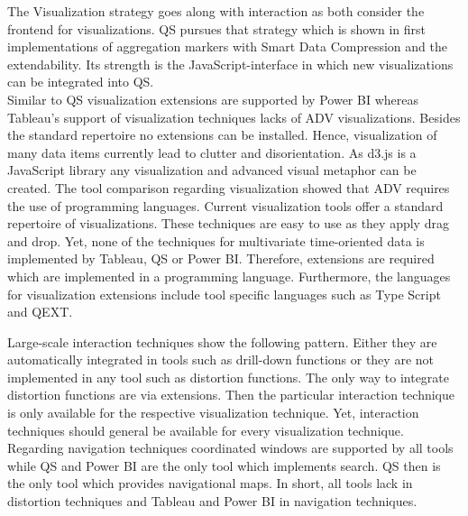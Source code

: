 The Visualization strategy goes along with interaction as both consider the frontend for visualizations. QS pursues that strategy which is shown in first implementations of aggregation markers with Smart Data Compression and the extendability. Its strength is the JavaScript-interface in which new visualizations can be integrated into QS. \\
Similar to QS visualization extensions are supported by Power BI whereas Tableau's support of visualization techniques lacks of ADV visualizations. Besides the standard repertoire no extensions can be installed. Hence, visualization of many data items currently lead to clutter and disorientation. As d3.js is a JavaScript library any visualization and advanced visual metaphor can be created.
The tool comparison regarding visualization showed that ADV requires the use of programming languages. Current visualization tools offer a standard repertoire of visualizations. These techniques are easy to use as they apply drag and drop. Yet, none of the techniques for multivariate time-oriented data is implemented by Tableau, QS or Power BI. Therefore, extensions are required which are implemented in a programming language. Furthermore, the languages for visualization extensions include tool specific languages such as Type Script and QEXT.\\
\par
Large-scale interaction techniques show the following pattern. Either they are automatically integrated in tools such as drill-down functions or they are not implemented in any tool such as distortion functions. The only way to integrate distortion functions are via extensions. Then the particular interaction technique is only available for the respective visualization technique. Yet, interaction techniques should general be available for every visualization technique.
Regarding navigation techniques coordinated windows are supported by all tools while QS and Power BI are the only tool which implements search. QS then is the only tool which provides navigational maps.
In short, all tools lack in distortion techniques and Tableau and Power BI in navigation techniques. 
\par


